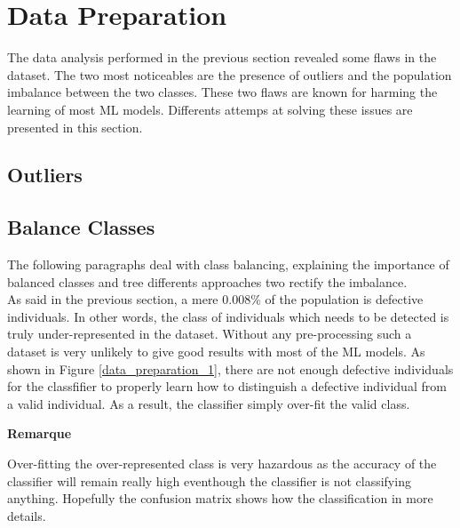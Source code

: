 \section{Data Preparation}
The data analysis performed in the previous section revealed some flaws in the dataset. The two most noticeables are the presence of outliers and the population imbalance between the two classes. These two flaws are known for harming the learning of most ML models. Differents attemps at solving these issues are presented in this section.

\subsection{Outliers}

\subsection{Balance Classes}
The following paragraphs deal with class balancing, explaining the importance of balanced classes and tree differents approaches two rectify the imbalance.\\

As said in the previous section, a mere 0.008\% of the population is defective individuals. In other words, the class of individuals which needs to be detected is truly under-represented in the dataset.
Without any pre-processing such a dataset is very unlikely to give good results with most of the ML models. As shown in Figure \ref{data_preparation_1}, there are not enough defective individuals for the classfifier to properly learn how to distinguish a defective individual from a valid individual. As a result, the classifier simply over-fit the valid class.\\

\noindent
\begin{minipage}[!hc]{0.12\textwidth}
   \textbf{Remarque}
\end{minipage}
\vrule\enskip\vrule\quad\begin{minipage}{\dimexpr 0.87\textwidth-0.8pt-1.5em}
Over-fitting the over-represented class is very hazardous as the accuracy of the classifier will remain really high eventhough the classifier is not classifying anything. Hopefully the confusion matrix shows how the classification in more details.
\end{minipage}\\


